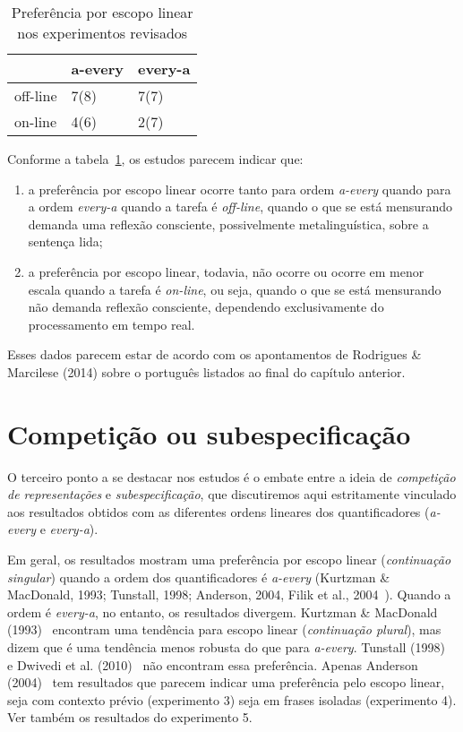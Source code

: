 \begin{table}[h]
    \centering
    \begin{tabular}{lll}
    \toprule
         & a-every & every-a  \\ [.3em]
         \midrule
         off-line & 7(8) & 7(7) \\
         on-line & 4(6) & 2(7) \\
    \bottomrule
    \end{tabular}
    \caption{Preferência por escopo linear nos experimentos revisados}
    \label{tab:t1}
\end{table}

Conforme a tabela~\ref{tab:t1}, os estudos parecem indicar que:

\begin{enumerate}[label=(\roman*)]
    \item a preferência por escopo linear ocorre tanto para ordem \emph{a-every} quando para a ordem \emph{every-a} quando a tarefa é \emph{off-line}, quando o que se está mensurando demanda uma reflexão consciente, possivelmente metalinguística, sobre a sentença lida;
    \item a preferência por escopo linear, todavia, não ocorre ou ocorre em menor escala quando a tarefa é \emph{on-line}, ou seja, quando o que se está mensurando não demanda reflexão consciente, dependendo exclusivamente do processamento em tempo real.
\end{enumerate}

Esses dados parecem estar de acordo com os apontamentos de Rodrigues \& Marcilese (2014) sobre o português listados ao final do capítulo anterior.

\section{Competição ou subespecificação}
O terceiro ponto a se destacar nos estudos é o embate entre a ideia de \emph{competição de representações} e \emph{subespecificação}, que discutiremos aqui estritamente vinculado aos resultados obtidos com as diferentes ordens lineares dos quantificadores (\emph{a-every} e \emph{every-a}).

Em geral, os resultados mostram uma preferência por escopo linear (\emph{continuação singular}) quando a ordem dos quantificadores é \emph{a-every} (Kurtzman \& MacDonald, 1993; Tunstall, 1998; Anderson, 2004, Filik et al., 2004~\cite{filik2004}). Quando a ordem é \emph{every-a}, no entanto, os resultados divergem. Kurtzman \& MacDonald (1993)~\cite{KMac1993} encontram uma tendência para escopo linear (\emph{continuação plural}), mas dizem que é uma tendência menos robusta do que para \emph{a-every}. Tunstall (1998)~\cite{Tunstall1998} e Dwivedi et al. (2010)~\cite{Dwivedi2010} não encontram essa preferência. Apenas Anderson (2004)~\cite{Anderson2004} tem resultados que parecem indicar uma preferência pelo escopo linear, seja com contexto prévio (experimento 3) seja em frases isoladas (experimento 4). Ver também os resultados do experimento 5.


